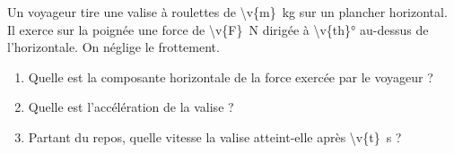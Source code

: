 Un voyageur tire une valise à roulettes de \qty{\v{m}}{kg} sur un plancher horizontal. Il exerce sur la poignée une force de \qty{\v{F}}{N} dirigée à \ang{\v{th}} au-dessus de l'horizontale. On néglige le frottement.

\begin{enumerate}[label=\alph*)]
    \item Quelle est la composante horizontale de la force exercée par le voyageur ?
    \item Quelle est l'accélération de la valise ?
    \item Partant du repos, quelle vitesse la valise atteint-elle après \qty{\v{t}}{s} ?
\end{enumerate}
